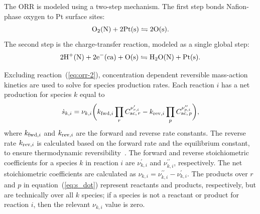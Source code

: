 \documentclass[final,3p,times,twocolumn]{elsarticle}    %
\begin{document}
The ORR is modeled using a two-step mechanism. The first step bonds Nafion-phase oxygen to Pt surface sites: 
\begin{equation} \label{eq:orr-1}
    {\rm O_2(N) + 2Pt(s) \leftrightharpoons 2O(s).} 
\end{equation}
The second step is the charge-transfer reaction, modeled as a single global step:
\begin{equation} \label{eq:orr-2}
    {\rm 2H^{+}(N) + 2e^{-}(ca) + O(s) \leftrightharpoons H_2O(N) + Pt(s).} 
\end{equation}

Excluding reaction~(\ref{eq:orr-2}), concentration dependent reversible mass-action kinetics are used to solve for species production rates. Each reaction $i$ has a net production for species $k$ equal to
\begin{equation} \label{eq:s_dot}
    \dot{s}_{k,i} = \nu_{k,i} \bigg( k_{{\rm fwd},i} \prod_{r} C_{{\rm ac},\,r}^{\nu_{r,i}^{\prime}} 
                  - k_{{\rm rev},i} \prod_{p} C_{{\rm ac},\,p}^{\nu_{p,i}^{\prime \prime}} \bigg), 
\end{equation}
where $k_{{\rm fwd},i}$ and $k_{{\rm rev},i}$ are the forward and reverse rate constants. The reverse rate $k_{{\rm rev},i}$ is calculated based on the forward rate and the equilibrium constant, to ensure thermodynamic reversibility~\cite{bib:decaluwe_weddle_2018}. The forward and reverse stoichiometric coefficients for a species $k$ in reaction $i$ are $\nu_{k,i}^{\prime}$ and $\nu_{k,i}^{\prime \prime}$, respectively. The net stoichiometric coefficients are calculated as $\nu_{k,i} = \nu_{k,i}^{\prime \prime} - \nu_{k,i}^{\prime}$. The products over $r$ and $p$ in equation~(\ref{eq:s_dot}) represent reactants and products, respectively, but are technically over all $k$ species; if a species is not a reactant or product for reaction $i$, then the relevant $\nu_{k,i}$ value is zero.
\end{document}
